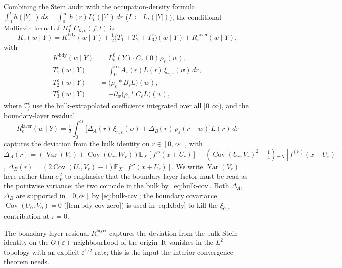 \documentclass[EJP]{ejpecp}
\renewcommand{\E}{\mathbb{E}}
\newcommand{\IBM}{Z}
\newcommand{\Pir}{\Pi}
\DeclareMathOperator{\Var}{Var}
\DeclareMathOperator{\Cov}{Cov}
\begin{document}
Combining the Stein audit with the occupation-density formula
$\int_0^t h(|Y_s|)\,ds=\int_0^\infty h(r)L_t^{r}(|Y|)\,dr$
($L\coloneqq L_t^{\cdot}(|Y|)$), the conditional Malliavin kernel
of $\Pir_1^{X}\,C_{\IBM,\varepsilon}(f;t)$ is
\begin{equation}\label{eq:Keps-decomp}
 K_{\varepsilon}(w\mid Y)
 =K_{\varepsilon}^{\mathrm{bdy}}(w\mid Y)
 +\tfrac12\bigl(T_{1}^{\varepsilon}+T_{2}^{\varepsilon}+T_{3}^{\varepsilon}\bigr)(w\mid Y)
 +R_{\varepsilon}^{\mathrm{layer}}(w\mid Y),
\end{equation}
with
\begin{align}
 K_{\varepsilon}^{\mathrm{bdy}}(w\mid Y)
 &=L_{t}^{0}(Y)\cdot C_{\varepsilon}(0)\,\rho_{\varepsilon}(w),\label{eq:Kbdy}\\
 T_{1}^{\varepsilon}(w\mid Y)
 &=\int_{0}^{\infty}A_{\varepsilon}(r)L(r)\,\xi_{r,\varepsilon}(w)\,dr,\label{eq:T1}\\
 T_{2}^{\varepsilon}(w\mid Y)
 &=\bigl(\rho_{\varepsilon}*B_{\varepsilon}L\bigr)(w),\label{eq:T2}\\
 T_{3}^{\varepsilon}(w\mid Y)
 &=-\partial_{w}\bigl(\rho_{\varepsilon}*C_{\varepsilon}L\bigr)(w),\label{eq:T3}
\end{align}
where $T_j^{\varepsilon}$ use the bulk-extrapolated coefficients
integrated over all $[0,\infty)$, and the boundary-layer residual
\begin{equation}\label{eq:R-layer}
 R_{\varepsilon}^{\mathrm{layer}}(w\mid Y)
 =\tfrac12\!\int_{0}^{c\varepsilon}\!\!\bigl[\Delta_{A}(r)\,\xi_{r,\varepsilon}(w)
 +\Delta_{B}(r)\,\rho_{\varepsilon}(r-w)\bigr]L(r)\,dr
\end{equation}
captures the deviation from the bulk identity on $r\in[0,c\varepsilon]$,
with
$\Delta_{A}(r)=(\Var(V_r)+\Cov(U_{r},W_{r}))\E_{X}[f'''(x+U_{r})]
+(\Cov(U_{r},V_{r})^{2}-\tfrac14)\E_{X}[f^{(5)}(x+U_{r})]$,
$\Delta_{B}(r)=(2\Cov(U_{r},V_{r})-1)\E_{X}[f'''(x+U_{r})]$. We write
$\Var(V_r)$ here rather than $\sigma_V^{2}$ to emphasise that the
boundary-layer factor must be read as the pointwise variance; the
two coincide in the bulk by~\eqref{eq:bulk-cov}. Both
$\Delta_A$, $\Delta_B$ are supported in $[0,c\varepsilon]$ by
\eqref{eq:bulk-cov}; the boundary covariance
$\Cov(U_0,V_0)=0$ (\cref{lem:bdy-cov-zero}) is used in
\eqref{eq:Kbdy} to kill the $\xi_{0,\varepsilon}$ contribution at
$r=0$.

The boundary-layer residual $R_\varepsilon^{\mathrm{layer}}$
captures the deviation from the bulk Stein identity on the
$O(\varepsilon)$-neighbourhood of the origin. It vanishes in the
$L^{2}$ topology with an explicit $\varepsilon^{1/2}$ rate; this is
the input the interior convergence theorem needs.
\end{document}
